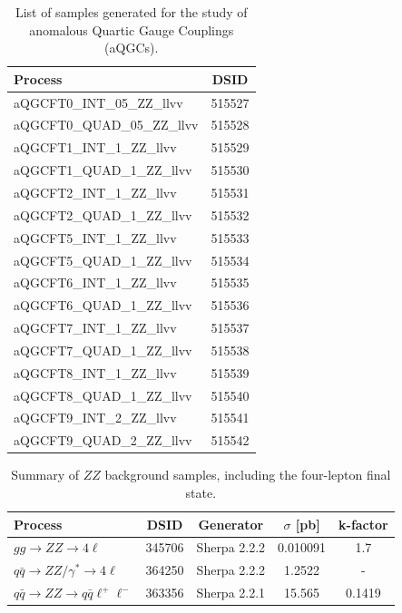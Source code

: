 \begin{table}[htbp]
\centering
\scriptsize
\begin{tabularx}{400pt}{|X|c|}
\hline
\centering \textbf{Process} & \textbf{DSID} \\
\hline
aQGCFT0\_INT\_05\_ZZ\_llvv & 515527 \\ \hline
aQGCFT0\_QUAD\_05\_ZZ\_llvv & 515528 \\ \hline
aQGCFT1\_INT\_1\_ZZ\_llvv & 515529 \\ \hline
aQGCFT1\_QUAD\_1\_ZZ\_llvv & 515530 \\ \hline
aQGCFT2\_INT\_1\_ZZ\_llvv & 515531 \\ \hline
aQGCFT2\_QUAD\_1\_ZZ\_llvv & 515532 \\ \hline
aQGCFT5\_INT\_1\_ZZ\_llvv & 515533 \\ \hline
aQGCFT5\_QUAD\_1\_ZZ\_llvv & 515534 \\ \hline
aQGCFT6\_INT\_1\_ZZ\_llvv & 515535 \\ \hline
aQGCFT6\_QUAD\_1\_ZZ\_llvv & 515536 \\ \hline
aQGCFT7\_INT\_1\_ZZ\_llvv & 515537 \\ \hline
aQGCFT7\_QUAD\_1\_ZZ\_llvv & 515538 \\ \hline
aQGCFT8\_INT\_1\_ZZ\_llvv & 515539 \\ \hline
aQGCFT8\_QUAD\_1\_ZZ\_llvv & 515540 \\ \hline
aQGCFT9\_INT\_2\_ZZ\_llvv & 515541 \\ \hline
aQGCFT9\_QUAD\_2\_ZZ\_llvv & 515542 \\ \hline
\end{tabularx}
\caption{\rm List of samples generated for the study of anomalous Quartic Gauge Couplings (aQGCs).}
\label{tab:ZZaQGCsamples}
\end{table}

\begin{table}[htbp]
\centering
\scriptsize
\begin{tabularx}{400pt}{|X||c|c|c|c|}
\hline
\centering \textbf{Process} & \textbf{DSID} & \textbf{Generator} & \textbf{$\sigma$ [pb]} & \textbf{k-factor}\\
\hline
\centering $gg\rightarrow ZZ \to 4\ell$ & 345706 & Sherpa 2.2.2 & 0.010091 & 1.7 \\ \hline 
\centering $q\bar{q}\rightarrow ZZ/\gamma^* \to 4\ell$ & 364250 & Sherpa 2.2.2 & 1.2522 & - \\ \hline 
\centering $q\bar{q}\rightarrow ZZ \rightarrow q\bar{q} \ell^+\ell^-$ & 363356 & Sherpa 2.2.1 & 15.565 & 0.1419 \\ \hline 
\end{tabularx}
\caption{\rm Summary of $ZZ$ background samples, including the four-lepton final state.}
\label{tab:ZZbkg_samples}
\end{table}

